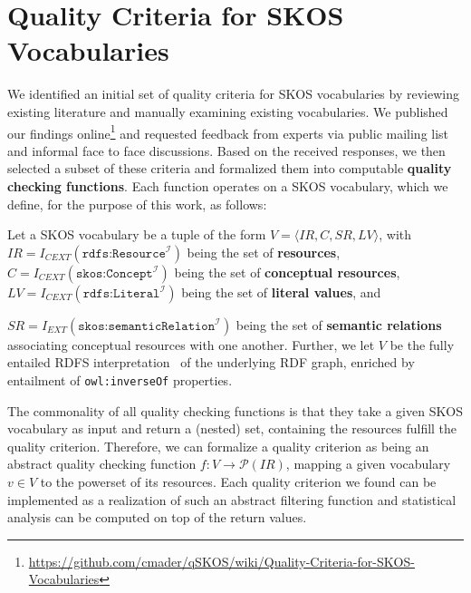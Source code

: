 
\section{Quality Criteria for SKOS Vocabularies}\label{sec:criteria}


We identified an initial set of quality criteria for SKOS vocabularies by reviewing existing literature and manually examining existing vocabularies. We published our findings online\footnote{\url{https://github.com/cmader/qSKOS/wiki/Quality-Criteria-for-SKOS-Vocabularies}} and requested feedback from experts via public mailing list and informal face to face discussions. Based on the received responses, we then selected a subset of these criteria and formalized them into computable \textbf{quality checking functions}. Each function operates on a SKOS vocabulary, which we define, for the purpose of this work, as follows:

\begin{definition} Let a SKOS vocabulary be a tuple of the form $V = \langle IR, C, SR, LV \rangle$, with \(IR = I_{CEXT}(\texttt{rdfs:Resource}^\mathcal{I})\) being the set of \textbf{resources}, \(C = I_{CEXT}(\texttt{skos:Concept}^\mathcal{I})\) being the set of \textbf{conceptual resources}, $LV = I_{CEXT}(\texttt{rdfs:Literal}^\mathcal{I})$ being the set of \textbf{literal values}, and \item \(SR = I_{EXT}(\texttt{skos:semanticRelation}^\mathcal{I})\) being the set of \textbf{semantic relations} associating conceptual resources with one another. Further, we let $V$ be the fully entailed RDFS interpretation~\cite{RDFSEM2012} of the underlying RDF graph, enriched by entailment of \texttt{owl:inverseOf} properties. 

\end{definition}

The commonality of all quality checking functions is that they take a given SKOS vocabulary as input and return a (nested) set, containing the resources fulfill the quality criterion. Therefore, we can formalize a quality criterion as being an abstract quality checking function $f:V \rightarrow \mathcal{P}(IR)$, mapping a given vocabulary $v \in V$ to the powerset of its resources. Each quality criterion we found can be implemented as a realization of such an abstract filtering function and statistical analysis can be computed on top of the return values.

